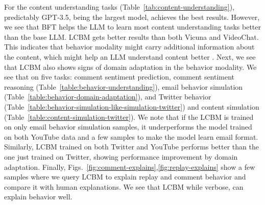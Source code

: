 For the content understanding tasks (Table~\ref{tab:content-understanding}), predictably GPT-3.5, being the largest model, achieves the best results. However, we see that BFT helps the LLM to learn most content understanding tasks better than the base LLM. LCBM gets better results than both Vicuna and VideoChat. This indicates that behavior modality might carry additional information about the content, which might help an LLM understand content better \citep{khurana-etal-2023-synthesizing,klerke-etal-2016-improving,plank2016keystroke}. 
Next, we see that LCBM also shows signs of domain adaptation in the behavior modality. We see that on five tasks: comment sentiment prediction, comment sentiment reasoning (Table~\ref{table:behavior-understanding}), email behavior simulation (Table~\ref{table:behavior-domain-adaptation}), and Twitter behavior (Table~\ref{table:behavior-simulation-like-simulation-twitter}) and content simulation (Table~\ref{table:content-simulation-twitter}). We note that if the LCBM is trained on only email behavior simulation samples, it underperforms the model trained on both YouTube data and a few samples to make the model learn email format. Similarly, LCBM trained on both Twitter and YouTube performs better than the one just trained on Twitter, showing performance improvement by domain adaptation. Finally, Figs.~\ref{fig:comment-explains},\ref{fig:replay-explains} show a few samples where we query LCBM to explain replay and comment behavior and compare it with human explanations. We see that LCBM while verbose, can explain behavior well.





